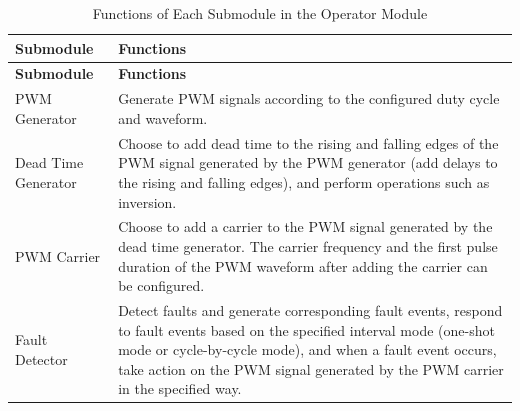 \begin{longtable}[c]{|m{5cm}|m{10cm}|}
\caption{Functions of Each Submodule in the Operator Module}
\label{tab:mcpwm-param-operator}
    \\\hline
    \rowcolor{lightgray}
   \textbf{Submodule} & \textbf{Functions} \\ \hline 

\endfirsthead\hline
 \rowcolor{lightgray}
   \textbf{Submodule} & \textbf{Functions}\\
 \hline 
\endhead
\endfoot
PWM Generator & Generate PWM signals according to the configured duty cycle and waveform. \\\hline
    
Dead Time Generator  & Choose to add dead time to the rising and falling edges of the PWM signal generated by the PWM generator (add delays to the rising and falling edges), and perform operations such as inversion. \\\hline
    
PWM Carrier & Choose to add a carrier to the PWM signal generated by the dead time generator. The carrier frequency and the first pulse duration of the PWM waveform after adding the carrier can be configured. \\\hline
    
Fault Detector & Detect faults and generate corresponding fault events, respond to fault events based on the specified interval mode (one-shot mode or cycle-by-cycle mode), and when a fault event occurs, take action on the PWM signal generated by the PWM carrier in the specified way. \\\hline

    
\end{longtable}
